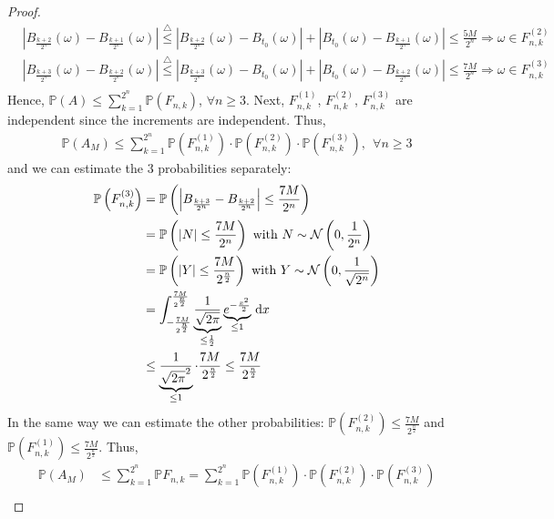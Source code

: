 \begin{proof}
\begin{align*}
		&\left\vert B_{\frac{k+2}{2^n}}(\omega) - B_{\frac{k+1}{2^n}}(\omega)\right\vert \overset{\triangle}{\leq} \left\vert B_{\frac{k+2}{2^n}}(\omega) - B_{t_0}(\omega) \right\vert + \left\vert B_{t_0}(\omega) -  B_{\frac{k+1}{2^n}}(\omega) \right\vert \leq \frac{5M}{2^n} \Rightarrow \omega \in F_{n,k}^{(2)} \\
		&\left\vert B_{\frac{k+3}{2^n}}(\omega) - B_{\frac{k+2}{2^n}}(\omega)\right\vert \overset{\triangle}{\leq} \left\vert B_{\frac{k+3}{2^n}}(\omega) - B_{t_0}(\omega) \right\vert + \left\vert B_{t_0}(\omega) -  B_{\frac{k+2}{2^n}}(\omega) \right\vert \leq \frac{7M}{2^n} \Rightarrow \omega \in F_{n,k}^{(3)} \\
	\end{align*}
	Hence, $\mathbb{P}(A) \leq \sum_{k=1}^{2^n} \mathbb{P}(F_{n,k})$, $\forall n \geq 3$. Next, $F_{n,k}^{(1)}$, $F_{n,k}^{(2)}$, $F_{n,k}^{(3)}$ are independent since the increments are independent. Thus,
	\begin{align*}
		\mathbb{P}(A_M) \leq \sum_{k=1}^{2^n} \mathbb{P}\left(F_{n,k}^{(1)}\right) \cdot \mathbb{P}\left(F_{n,k}^{(2)}\right) \cdot \mathbb{P}\left(F_{n,k}^{(3)}\right), \:\: \forall n \geq 3
	\end{align*}
	and we can estimate the $3$ probabilities separately:
	\begin{align*}
		 \mathbb{P}\left(F_{n,k}^{(3)}\right) &= \mathbb{P}\left( \left\vert B_{\frac{k+3}{2^n}}- B_{\frac{k+2}{2^n}} \right\vert \leq \frac{7M}{2^n}\right) \\
		 &= \mathbb{P}\left( \lvert N \rvert \leq \frac{7M}{2^n}\right) \text{ with } N \sim \mathcal{N}\left( 0, \frac{1}{2^n}\right)\\
		 &= \mathbb{P}\left( \lvert Y \rvert \leq \frac{7M}{2^{\frac{n}{2}}}\right) \text{ with } Y \sim \mathcal{N}\left( 0, \frac{1}{\sqrt{2^n}}\right) \\
		 &= \int_{-\frac{7M}{2^{\frac{n}{2}}}}^{\frac{7M}{2^{\frac{n}{2}}}} \underbrace{\frac{1}{\sqrt{2\pi}}}_{\leq \frac{1}{2}} \underbrace{e^{-\frac{x^2}{2}}}_{\leq 1} \, \mathrm{d} x \\
		 &\leq \underbrace{\frac{1}{\sqrt{2\pi}^2}}_{\leq 1} \cdot \frac{7M}{2^{\frac{n}{2}}} \leq \frac{7M}{2^{\frac{n}{2}}}
	\end{align*}
	In the same way we can estimate the other probabilities:
	$\mathbb{P}\left( F_{n,k}^{(2)}\right) \leq \frac{7M}{2^{\frac{n}{2}}}$ and $\mathbb{P}\left( F_{n,k}^{(1)}\right) \leq \frac{7M}{2^{\frac{n}{2}}}$. Thus, 
	\begin{align*}
		\mathbb{P}(A_M) &\leq \sum_{k=1}^{2^n} \mathbb{P}F_{n,k} = \sum_{k=1}^{2^n} \mathbb{P}\left(F_{n,k}^{(1)}\right) \cdot \mathbb{P}\left(F_{n,k}^{(2)}\right) \cdot \mathbb{P}\left(F_{n,k}^{(3)}\right) \\

\end{align*}
\end{proof}
